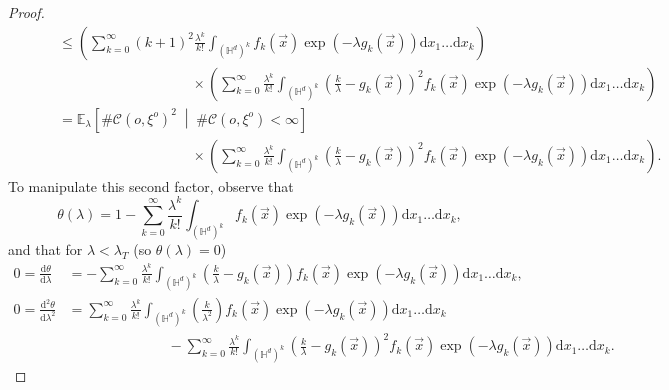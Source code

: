 \documentclass[10pt,a4paper,dvipsnames]{article}
\theoremstyle{definition}
\theoremstyle{remark}
\newcommand{\ela}{\mathbb E_{\lambda}}
\newcommand{\HypDim}{{\mathbb{H}^d}}
\newcommand{\dd}{\mathrm{d}} %
\newcommand{\C}{\mathscr {C}}
\newcommand{\orig}{o}
\numberwithin{equation}{section}
\begin{document}
\begin{proof}
\begin{align}
        &\hspace{1cm}\leq \left(\sum^\infty_{k=0}\left(k+1\right)^2\frac{\lambda^k}{k!} \int_{\left(\HypDim\right)^k}f_k\left(\vec{x}\right)\exp\left(-\lambda g_k\left(\vec{x}\right)\right)\dd x_1\ldots \dd x_{k}\right)\nonumber\\
        &\hspace{5cm}\times\left(\sum^\infty_{k=0}\frac{\lambda^k}{k!} \int_{\left(\HypDim\right)^k}\left(\frac{k}{\lambda}-g_k\left(\vec{x}\right)\right)^2f_k\left(\vec{x}\right)\exp\left(-\lambda g_k\left(\vec{x}\right)\right)\dd x_1\ldots \dd x_{k}\right)\nonumber\\
        &\hspace{1cm} =\ela\left[\#\C\left(\orig,\xi^{\orig}\right)^2 \;\middle|\;\#\C\left(\orig,\xi^{\orig}\right)<\infty\right]\nonumber\\
        &\hspace{5cm}\times\left(\sum^\infty_{k=0}\frac{\lambda^k}{k!} \int_{\left(\HypDim\right)^k}\left(\frac{k}{\lambda}-g_k\left(\vec{x}\right)\right)^2f_k\left(\vec{x}\right)\exp\left(-\lambda g_k\left(\vec{x}\right)\right)\dd x_1\ldots \dd x_{k}\right).
    \end{align}
    To manipulate this second factor, observe that
    \begin{equation}
        \theta\left(\lambda\right) = 1 - \sum^\infty_{k=0}\frac{\lambda^k}{k!} \int_{\left(\HypDim\right)^k}f_k\left(\vec{x}\right)\exp\left(-\lambda g_k\left(\vec{x}\right)\right)\dd x_1\ldots \dd x_{k},
    \end{equation}
    and that for $\lambda<\lambda_T$ (so $\theta\left(\lambda\right)=0$)
    \begin{align}
        0 = \frac{\dd \theta}{\dd \lambda} &= - \sum^\infty_{k=0}\frac{\lambda^k}{k!} \int_{\left(\HypDim\right)^k}\left(\frac{k}{\lambda}-g_k\left(\vec{x}\right)\right)f_k\left(\vec{x}\right)\exp\left(-\lambda g_k\left(\vec{x}\right)\right)\dd x_1\ldots \dd x_{k},\\
        0 = \frac{\dd^2 \theta}{\dd \lambda^2} &= \sum^\infty_{k=0}\frac{\lambda^k}{k!} \int_{\left(\HypDim\right)^k}\left(\frac{k}{\lambda^2}\right)f_k\left(\vec{x}\right)\exp\left(-\lambda g_k\left(\vec{x}\right)\right)\dd x_1\ldots \dd x_{k} \nonumber\\
        &\hspace{3cm}- \sum^\infty_{k=0}\frac{\lambda^k}{k!} \int_{\left(\HypDim\right)^k}\left(\frac{k}{\lambda}-g_k\left(\vec{x}\right)\right)^2f_k\left(\vec{x}\right)\exp\left(-\lambda g_k\left(\vec{x}\right)\right)\dd x_1\ldots \dd x_{k}.

\end{align}
\end{proof}
\end{document}
